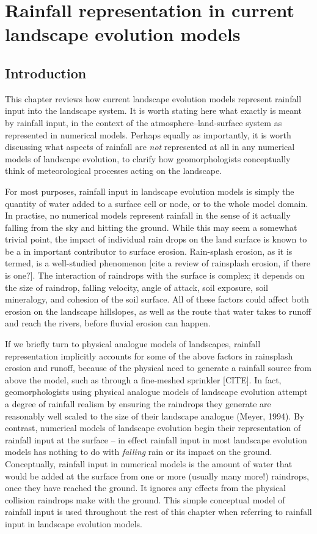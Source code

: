 \chapter{Rainfall representation in current landscape evolution models}
\label{chapter_RainfallInLEMs}

\section{Introduction}
This chapter reviews how current landscape evolution models represent rainfall input into the landscape system. It is worth stating here what exactly is meant by rainfall input, in the context of the atmosphere--land-surface system as represented in numerical models. Perhaps equally as importantly, it is worth discussing what aspects of rainfall are \textit{not} represented at all in any numerical models of landscape evolution, to clarify how geomorphologists conceptually think of meteorological processes acting on the landscape.

For most purposes, rainfall input in landscape evolution models is simply the quantity of water added to a surface cell or node, or to the whole model domain. In practise, no numerical models represent rainfall in the sense of it actually falling from the sky and hitting the ground. While this may seem a somewhat trivial point, the impact of individual rain drops on the land surface is known to be a in important contributor to surface erosion. Rain-splash erosion, as it is termed, is a well-studied phenomenon [cite a review of rainsplash erosion, if there is one?]. The interaction of raindrops with the surface is complex; it depends on the size of raindrop, falling velocity, angle of attack, soil exposure, soil mineralogy, and cohesion of the soil surface. All of these factors could affect both erosion on the landscape hillslopes, as well as the route that water takes to runoff and reach the rivers, before fluvial erosion can happen.

If we briefly turn to physical analogue models of landscapes, rainfall representation implicitly accounts for some of the above factors in rainsplash erosion and runoff, because of the physical need to generate a rainfall source from above the model, such as through a fine-meshed sprinkler [CITE]. In fact, geomorphologists using physical analogue models of landscape evolution attempt a degree of rainfall realism by ensuring the raindrops they generate are reasonably well scaled to the size of their landscape analogue (Meyer, 1994). By contrast, numerical models of landscape evolution begin their representation of rainfall input at the surface -- in effect rainfall input in most landscape evolution models has nothing to do with \textit{falling} rain or its impact on the ground. Conceptually, rainfall input in numerical models is the amount of water that would be added at the surface from one or more (usually many more!) raindrops, once they have reached the ground. It ignores any effects from the physical collision raindrops make with the ground. This simple conceptual model of rainfall input is used throughout the rest of this chapter when referring to rainfall input in landscape evolution models.

